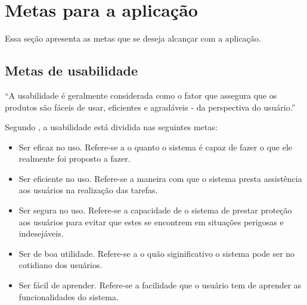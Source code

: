 \chapter{Metas para a aplicação}
  
  Essa seção apresenta as metas que se deseja alcançar com a aplicação.

  \section{Metas de usabilidade}
  
    “A usabilidade é geralmente considerada como o fator que assegura que os produtos são fáceis de usar, 
    eficientes e agradáveis - da perspectiva do usuário.” \cite{preece}
    
    Segundo \cite{preece}, a usabilidade está dividida nas seguintes metas:
    
    \begin{itemize}
       \item Ser eficaz no uso.
       \subitem Refere-se a o quanto o sistema é capaz de fazer o que ele realmente foi proposto a fazer.
    \end{itemize}
    
    \begin{itemize}
       \item Ser eficiente no uso.
       \subitem Refere-se a maneira com que o sistema presta assistência aos usuários na realização das tarefas.
    \end{itemize}
    
    \begin{itemize}
       \item Ser segura no uso.
       \subitem Refere-se a capacidade de o sistema de prestar proteção aos usuários para evitar que estes se encontrem 
       em situações perigosas e indesejáveis.
    \end{itemize}
    
    \begin{itemize}
       \item Ser de boa utilidade.
       \subitem Refere-se a o quão siginificativo o sistema pode ser no cotidiano dos usuários.
    \end{itemize}
    
    \begin{itemize}
       \item Ser fácil de aprender.
       \subitem Refere-se a facilidade que o usuário tem de aprender as funcionalidades do sistema.
    \end{itemize}
    
